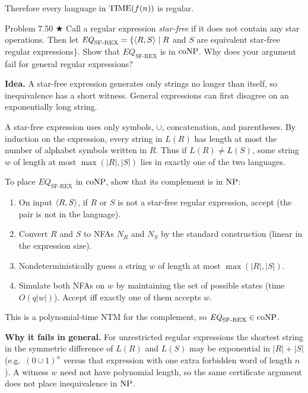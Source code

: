 \begin{soln}
Therefore every language in $\mathrm{TIME}(f(n))$ is regular.
\end{soln}

\begin{question}{Problem 7.50 $\bigstar$}
Call a regular expression \emph{star-free} if it does not contain any star operations. Then let $\mathit{EQ}_{\mathrm{SF\text{-}REX}}=\{\langle R,S\rangle\mid R$ and $S$ are equivalent star-free regular expressions$\}$. Show that $\mathit{EQ}_{\mathrm{SF\text{-}REX}}$ is in $\mathrm{coNP}$. Why does your argument fail for general regular expressions?
\end{question}
\begin{soln}
\textbf{Idea.} A star-free expression generates only strings no longer than itself, so inequivalence has a short witness. General expressions can first disagree on an exponentially long string.

A star-free expression uses only symbols, $\cup$, concatenation, and parentheses. By induction on the expression, every string in $L(R)$ has length at most the number of alphabet symbols written in $R$. Thus if $L(R)\neq L(S)$, some string $w$ of length at most $\max(\lvert R\rvert,\lvert S\rvert)$ lies in exactly one of the two languages.

To place $\mathit{EQ}_{\mathrm{SF\text{-}REX}}$ in $\mathrm{coNP}$, show that its complement is in $\mathrm{NP}$:
\begin{enumerate}
\item On input $\langle R,S\rangle$, if $R$ or $S$ is not a star-free regular expression, accept (the pair is not in the language).
\item Convert $R$ and $S$ to NFAs $N_R$ and $N_S$ by the standard construction (linear in the expression size).
\item Nondeterministically guess a string $w$ of length at most $\max(\lvert R\rvert,\lvert S\rvert)$.
\item Simulate both NFAs on $w$ by maintaining the set of possible states (time $O(q\lvert w\rvert)$). Accept iff exactly one of them accepts $w$.
\end{enumerate}
This is a polynomial-time NTM for the complement, so $\mathit{EQ}_{\mathrm{SF\text{-}REX}}\in\mathrm{coNP}$.

\textbf{Why it fails in general.}
For unrestricted regular expressions the shortest string in the symmetric difference of $L(R)$ and $L(S)$ may be exponential in $\lvert R\rvert+\lvert S\rvert$ (e.g.\ $(0\cup 1)^n$ versus that expression with one extra forbidden word of length $n$). A witness $w$ need not have polynomial length, so the same certificate argument does not place inequivalence in $\mathrm{NP}$.
\end{soln}

